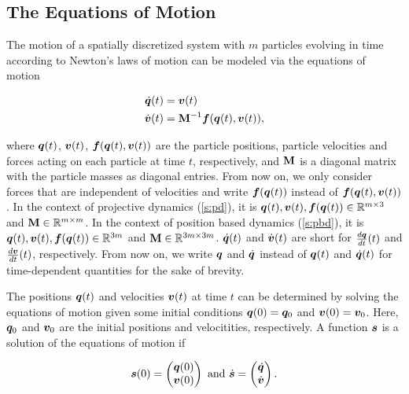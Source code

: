 \subsection{The Equations of Motion}\label{s:equations-of-motion}

The motion of a spatially discretized system with $m$ particles evolving in time according to Newton's laws of motion can be modeled via 
the equations of motion

\begin{align}
    \begin{split}\label{eq:equations-of-motion}
        \dot{\bm{q}}(t) &= \bm{v}(t) \\
        \dot{\bm{v}}(t) &= \mathbf{M}^{-1}\bm{f}(\bm{q}(t), \bm{v}(t)),
    \end{split}
\end{align}

\noindent where $\bm{q}(t)$, $\bm{v}(t)$, $\bm{f}(\bm{q}(t), \bm{v}(t))$ are the particle positions, particle velocities and 
forces acting on each particle at time $t$, respectively, and $\mathbf{M}$ is a diagonal matrix with the particle masses as diagonal entries. 
From now on, we only consider forces that are independent of velocities and write $\bm{f}(\bm{q}(t))$ instead of 
$\bm{f}(\bm{q}(t), \bm{v}(t))$. In the context of projective dynamics (\cref{s:pd}), it is
$\bm{q}(t), \bm{v}(t), \bm{f}(\bm{q}(t)) \in \mathbb{R}^{m \times 3}$ and $\mathbf{M} \in \mathbb{R}^{m \times m}$. 
In the context of position based dynamics (\cref{s:pbd}), it is $\bm{q}(t), \bm{v}(t), \bm{f}(\bm{q}(t)) \in \mathbb{R}^{3m}$ and $\mathbf{M} 
\in \mathbb{R}^{3m \times 3m}$. $\dot{\bm{q}}(t)$ and $\dot{\bm{v}}(t)$ are short for $\frac{d\bm{q}}{dt}(t)$ and
$\frac{d\bm{v}}{dt}(t)$, respectively. From now on, we write $\bm{q}$ and $\dot{\bm{q}}$ instead of $\bm{q}(t)$ and $\dot{\bm{q}}(t)$ for 
time-dependent quantities for the sake of brevity.

The positions $\bm{q}(t)$ and velocities $\bm{v}(t)$ at time $t$ can be determined by solving the equations of motion given some initial conditions
$\bm{q}(0) = \bm{q}_0$ and $\bm{v}(0) = \bm{v}_0$. Here, $\bm{q}_0$ and $\bm{v}_0$ are the initial positions and velocitities, respectively. 
A function $\bm{s}$ is a solution of the equations of motion if 

\[
    \bm{s}(0) = 
    \begin{pmatrix}
        \bm{q}(0)\\
        \bm{v}(0)
    \end{pmatrix} 
    \text{ and } 
    \dot{\bm{s}} = 
    \begin{pmatrix}
        \dot{\bm{q}}\\
        \dot{\bm{v}}
    \end{pmatrix}.
\]


